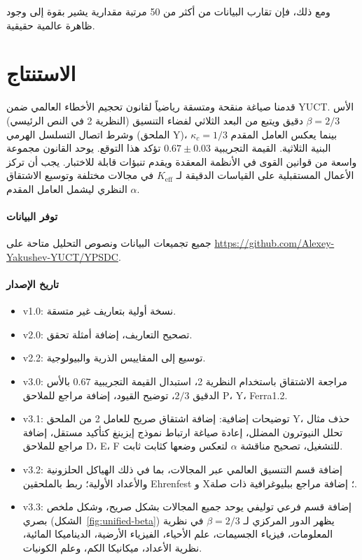 \documentclass[11pt,a4paper]{article}
\newcommand{\ar}[1]{\foreignlanguage{arabic}{#1}}
\newcommand{\Keff}{K_{\mathrm{eff}}}
\newcommand{\kappac}{\kappa_c}
\begin{document}
	\ar{ومع ذلك، فإن تقارب البيانات من أكثر من 50 مرتبة مقدارية يشير بقوة إلى وجود ظاهرة عالمية حقيقية.}
	
	\section{\ar{الاستنتاج}}
	\ar{قدمنا صياغة منقحة ومتسقة رياضياً لقانون تحجيم الأخطاء العالمي ضمن YUCT. الأس \(\beta = 2/3\) دقيق ويتبع من البعد الثلاثي لفضاء التنسيق (النظرية 2 في النص الرئيسي) وشرط اتصال التسلسل الهرمي (الملحق Y)، بينما يعكس العامل المقدم \(\kappac = 1/3\) البنية الثلاثية. القيمة التجريبية \(0.67 \pm 0.03\) تؤكد هذا التوقع. يوحد القانون مجموعة واسعة من قوانين القوى في الأنظمة المعقدة ويقدم تنبؤات قابلة للاختبار. يجب أن تركز الأعمال المستقبلية على القياسات الدقيقة لـ \(\Keff\) في مجالات مختلفة وتوسيع الاشتقاق النظري ليشمل العامل المقدم \(\alpha\).}
	
	\paragraph*{\ar{توفر البيانات}}
	\ar{جميع تجميعات البيانات ونصوص التحليل متاحة على} \url{https://github.com/Alexey-Yakushev-YUCT/YPSDC}.
	
	\paragraph*{\ar{تاريخ الإصدار}}
	\begin{itemize}
		\item v1.0: \ar{نسخة أولية بتعاريف غير متسقة.}
		\item v2.0: \ar{تصحيح التعاريف، إضافة أمثلة تحقق.}
		\item v2.2: \ar{توسيع إلى المقاييس الذرية والبيولوجية.}
		\item v3.0: \ar{مراجعة الاشتقاق باستخدام النظرية 2، استبدال القيمة التجريبية \(0.67\) بالأس الدقيق \(2/3\)، توضيح القيود، إضافة مراجع للملاحق P، Y، Ferra1.2.}
		\item v3.1: \ar{توضيحات إضافية: إضافة اشتقاق صريح للعامل 2 من الملحق Y، حذف مثال تحلل النيوترون المضلل، إعادة صياغة ارتباط نموذج إيزينغ كتأكيد مستقل، إضافة مراجع للملاحق D، E، F للتشغيل، تصحيح مناقشة \(\alpha\) لتعكس وضعها كثابت ثابت.}
		\item v3.2: \ar{إضافة قسم التنسيق العالمي عبر المجالات، بما في ذلك الهياكل الحلزونية والأعداد الأولية؛ ربط بالملحقين Ehrenfest و X؛ إضافة مراجع ببليوغرافية ذات صلة.}
		\item v3.3: \ar{إضافة قسم فرعي توليفي يوحد جميع المجالات بشكل صريح، وشكل ملخص بصري (الشكل~\ref{fig:unified-beta}) يظهر الدور المركزي لـ \(\beta = 2/3\) في نظرية المعلومات، فيزياء الجسيمات، علم الأحياء، الفيزياء الأرضية، الديناميكا المائية، نظرية الأعداد، ميكانيكا الكم، وعلم الكونيات.}
	\end{itemize}
	
\end{document}
